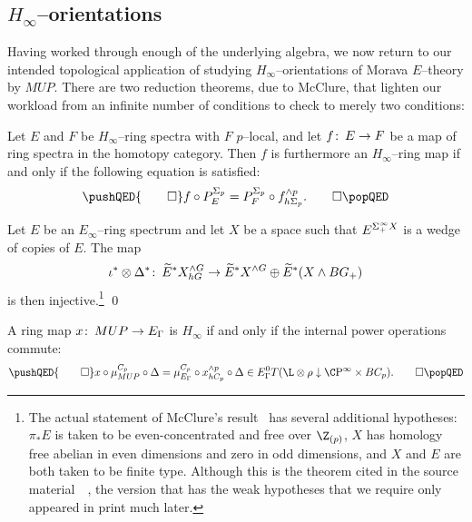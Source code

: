 \subsection*{$H_\infty$--orientations}

Having worked through enough of the underlying algebra, we now return to our intended topological application of studying $H_\infty$--orientations of Morava $E$--theory by $MUP$.  There are two reduction theorems, due to McClure, that lighten our workload from an infinite number of conditions to check to merely two conditions:

\begin{theorem}
Let $E$ and $F$ be $H_\infty$--ring spectra with $F$ $p$--local, and let $f\colon\thinspace E \to F$ be a map of ring spectra in the homotopy category.  Then $f$ is furthermore an $H_\infty$--ring map if and only if the following equation is satisfied:
\[
\pushQED{\qed}
f \circ P^{\Sigma_p}_E = P^{\Sigma_p}_F \circ f^{\sm p}_{h\Sigma_p}. \qedhere
\popQED
\]
\end{theorem}

\begin{theorem}
Let $E$ be an $E_\infty$--ring spectrum and let $X$ be a space such that $E^{\Sigma^\infty_+ X}$ is a wedge of copies of $E$.  The map \[\iota^* \otimes \Delta^*\colon\thinspace \widetilde E^* X^{\wedge G}_{hG} \to \widetilde E^* X^{\wedge G} \oplus \widetilde E^*(X \wedge BG_+)\] is then injective.\footnote{The actual statement of McClure's result~\cite[Proposition VIII.7.3]{BMMS} has several additional hypotheses: $\pi_* E$ is taken to be even-concentrated and free over $\Z_{(p)}$, $X$ has homology free abelian in even dimensions and zero in odd dimensions, and $X$ and $E$ are both taken to be finite type.  Although this is the theorem cited in the source material~\cite[Section 4]{Ando}~\cite[Proof of Proposition 6.1]{AHSHinfty}, the version that has the weak hypotheses that we require only appeared in print much later.} \qed
\end{theorem}

\begin{corollary}
A ring map $x\colon\thinspace MUP \to E_\Gamma$ is $H_\infty$ if and only if the internal power operations commute: \[
\pushQED{\qed}
x \circ \mu^{C_p}_{MUP} \circ \Delta = \mu^{C_p}_{E_\Gamma} \circ x^{\sm p}_{hC_p} \circ \Delta \in E_\Gamma^0 T(\L \otimes \rho \downarrow \CP^\infty \times BC_p).
\qedhere
\popQED
\]
\end{corollary}

